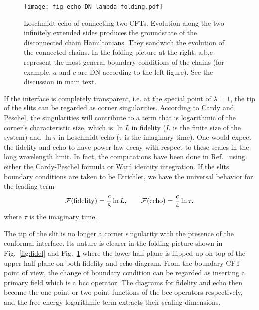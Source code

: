 \begin{figure}[h]
\centering
\texttt{[image: fig\_echo-DN-lambda-folding.pdf]}
\caption{Loschmidt echo of connecting two CFTs. Evolution along the two infinitely extended sides produces the groundstate of the disconnected chain Hamiltonians. They sandwich the evolution of the connected chains. In the folding picture at the right, a,b,c represent the most general boundary conditions of the chains (for example, $a$ and $c$ are DN according to the left figure). See the discussion in main text.}
\label{fig:echo}
\end{figure}

If the interface is completely transparent, i.e. at the special point of $\lambda = 1$, the tip of the slits can be regarded as corner singularities. According to Cardy and Peschel\cite{cardy_finite-size_1988}, the singularities will contribute to a term that is logarithmic of the corner's characteristic size, which is $\ln L$ in fidelity {\color{red}($L$ is the finite size of the system)} and $\ln \tau$ in Loschmidt echo {\color{red}($\tau$ is the imaginary time)}. One would expect the fidelity and echo to have power law decay with respect to these scales in the long wavelength limit. In fact, the computations have been done in Ref.~ using either the Cardy-Peschel formula or Ward identity integration. If the slits boundary conditions are taken to be Dirichlet, we have the universal behavior for the leading term \cite{stephan_logarithmic_2013,stephan_local_2011}
\begin{equation}
\label{eq:full-pass}
\mathcal{F}({\rm fidelity}) =  \frac{c}{8} \ln L, \qquad \mathcal{F}( {\rm echo} )  = \frac{c}{4} \ln \tau .
\end{equation}
where $\tau$ is the imaginary time. 

The tip of the slit is no longer a {\color{red}corner singularity\cite{cardy_finite-size_1988}} with the presence of the conformal interface. Its nature is clearer in the folding picture shown in Fig.~\ref{fig:fidel} and Fig.~\ref{fig:echo} where the lower half plane is flipped up on top of the upper half plane on both fidelity and echo diagram. From the boundary CFT point of view, the change of boundary condition can be regarded as inserting a primary field which is a bcc operator. The diagrams for fidelity and echo then become the one point or two point functions of the bcc operators respectively, and the free energy logarithmic term extracts their scaling dimensions. 


